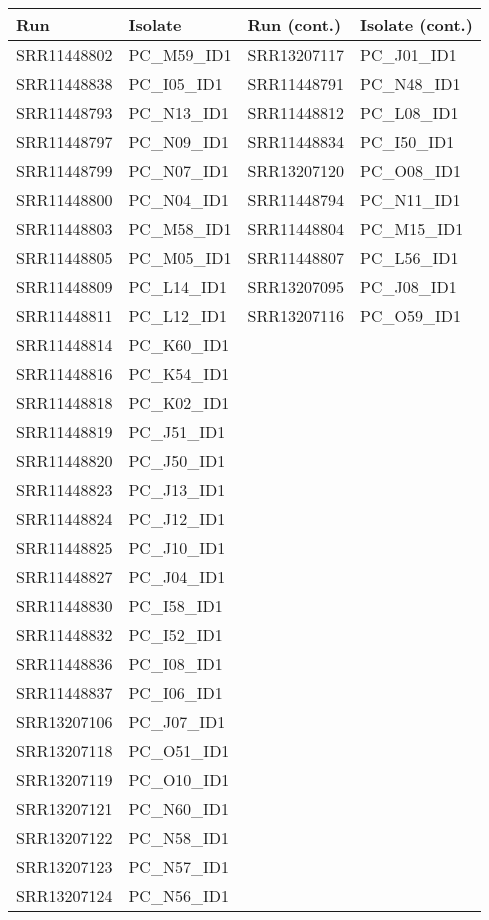 \begin{table}[ht]
\centering
\begin{tabular}{llll}
\hline
Run & Isolate & Run (cont.) & Isolate (cont.) \\
\hline
SRR11448802 & PC\_M59\_ID1 & SRR13207117 & PC\_J01\_ID1 \\
SRR11448838 & PC\_I05\_ID1 & SRR11448791 & PC\_N48\_ID1 \\
SRR11448793 & PC\_N13\_ID1 & SRR11448812 & PC\_L08\_ID1 \\
SRR11448797 & PC\_N09\_ID1 & SRR11448834 & PC\_I50\_ID1 \\
SRR11448799 & PC\_N07\_ID1 & SRR13207120 & PC\_O08\_ID1 \\
SRR11448800 & PC\_N04\_ID1 & SRR11448794 & PC\_N11\_ID1 \\
SRR11448803 & PC\_M58\_ID1 & SRR11448804 & PC\_M15\_ID1 \\
SRR11448805 & PC\_M05\_ID1 & SRR11448807 & PC\_L56\_ID1 \\
SRR11448809 & PC\_L14\_ID1 & SRR13207095 & PC\_J08\_ID1 \\
SRR11448811 & PC\_L12\_ID1 & SRR13207116 & PC\_O59\_ID1 \\
SRR11448814 & PC\_K60\_ID1 \\
SRR11448816 & PC\_K54\_ID1 \\
SRR11448818 & PC\_K02\_ID1 \\
SRR11448819 & PC\_J51\_ID1 \\
SRR11448820 & PC\_J50\_ID1 \\
SRR11448823 & PC\_J13\_ID1 \\
SRR11448824 & PC\_J12\_ID1 \\
SRR11448825 & PC\_J10\_ID1 \\
SRR11448827 & PC\_J04\_ID1 \\
SRR11448830 & PC\_I58\_ID1 \\
SRR11448832 & PC\_I52\_ID1 \\
SRR11448836 & PC\_I08\_ID1 \\
SRR11448837 & PC\_I06\_ID1 \\
SRR13207106 & PC\_J07\_ID1 \\
SRR13207118 & PC\_O51\_ID1 \\
SRR13207119 & PC\_O10\_ID1 \\
SRR13207121 & PC\_N60\_ID1 \\
SRR13207122 & PC\_N58\_ID1 \\
SRR13207123 & PC\_N57\_ID1 \\
SRR13207124 & PC\_N56\_ID1 \\

\end{tabular}
\end{table}
